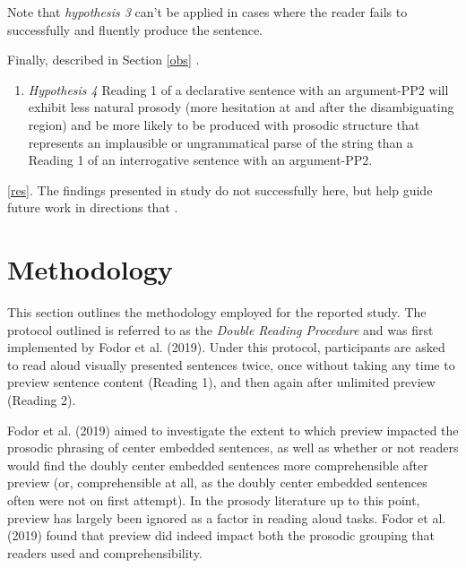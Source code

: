 \documentclass[12pt,oneside]{book}
\providecommand{\tightlist}{%
  \setlength{\itemsep}{0pt}\setlength{\parskip}{0pt}}
\begin{document}
Note that \emph{hypothesis 3} can't be applied in cases where the reader fails to successfully and fluently produce the sentence.

Finally,  described in Section \ref{obs} .

\begin{enumerate}
\def\labelenumi{(\arabic{enumi})}
\setcounter{enumi}{36}
\tightlist
\item
  \emph{Hypothesis 4}
  Reading 1 of a declarative sentence with an argument-PP2 will exhibit less natural prosody (more hesitation at and after the disambiguating region) and be more likely to be produced with prosodic structure that represents an implausible or ungrammatical parse of the string than a Reading 1 of an interrogative sentence with an argument-PP2.
\end{enumerate}

 \ref{res}. The findings presented in  study do not successfully  here, but  help guide future work in directions that .

\hypertarget{methodology}{%
\chapter{Methodology}\label{methodology}}

This section outlines the methodology employed for the reported study. The protocol outlined is referred to as the \emph{Double Reading Procedure} and was first implemented by Fodor et al. (2019). Under this protocol, participants are asked to read aloud visually presented sentences twice, once without taking any time to preview sentence content (Reading 1), and then again after unlimited preview (Reading 2).

Fodor et al. (2019) aimed to investigate the extent to which preview impacted the prosodic phrasing of center embedded sentences, as well as whether or not readers would find the doubly center embedded sentences more comprehensible after preview (or, comprehensible at all, as the doubly center embedded sentences often were not on first attempt). In the prosody literature up to this point, preview has largely been ignored as a factor in reading aloud tasks. Fodor et al. (2019) found that preview did indeed impact both the prosodic grouping that readers used and comprehensibility.
\end{document}
